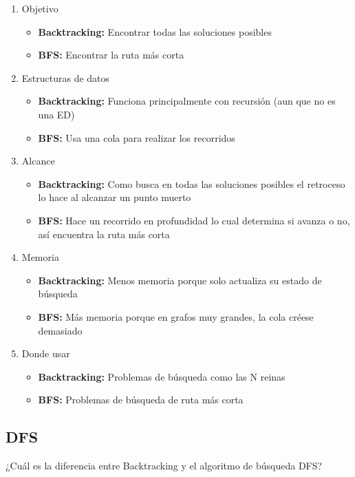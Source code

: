\begin{enumerate}
    \item Objetivo
    \begin{itemize}
        \item \textbf{Backtracking:} Encontrar todas las soluciones posibles
        \item \textbf{BFS:} Encontrar la ruta más corta
    \end{itemize}
    \item Estructuras de datos
    \begin{itemize}
        \item \textbf{Backtracking:} Funciona principalmente con recursión (aun que no es una ED)
        \item \textbf{BFS:} Usa una cola para realizar los recorridos
    \end{itemize}
    \item Alcance 
    \begin{itemize}
        \item \textbf{Backtracking:} Como busca en todas las soluciones posibles el retroceso lo hace al alcanzar un punto muerto
        \item \textbf{BFS:} Hace un recorrido en profundidad lo cual determina si avanza o no, así encuentra la ruta más corta
    \end{itemize}
    \item Memoria
    \begin{itemize}
        \item \textbf{Backtracking:} Menos memoria porque solo actualiza su estado de búsqueda
        \item \textbf{BFS:} Más memoria porque en grafos muy grandes, la cola créese demasiado 
    \end{itemize} 
    \item Donde usar
    \begin{itemize}
        \item \textbf{Backtracking:} Problemas de búsqueda como las N reinas
        \item \textbf{BFS:} Problemas de búsqueda de ruta más corta
    \end{itemize}    
\end{enumerate}


\subsection{DFS}
\begin{center}
    ¿Cuál es la diferencia entre Backtracking y el algoritmo de búsqueda DFS?
\end{center}

